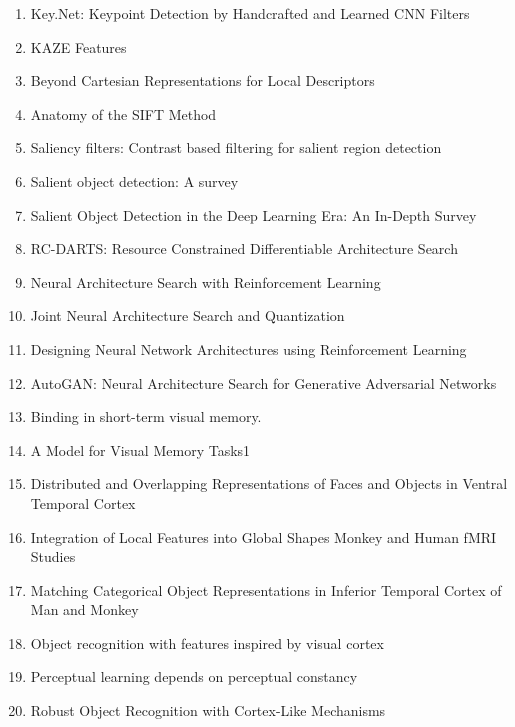 \documentclass[acmlarge]{acmart}
\begin{document}
\begin{enumerate}
	\item Key.Net: Keypoint Detection by Handcrafted and Learned CNN Filters \cite{Laguna2019KeyNetKD}
	\item KAZE Features \cite{Alcantarilla2012KAZEF}
	\item Beyond Cartesian Representations for Local Descriptors \cite{Ebel2019BeyondCR}
	\item Anatomy of the SIFT Method \cite{ReyOtero2014AnatomyOT}
	\item Saliency filters: Contrast based filtering for salient region detection \cite{Perazzi2012SaliencyFC}
	\item Salient object detection: A survey \cite{Borji2019SalientOD}
	\item Salient Object Detection in the Deep Learning Era: An In-Depth Survey \cite{Wang2019SalientOD}
	\item RC-DARTS: Resource Constrained Differentiable Architecture Search \cite{Jin2019RCDARTSRC}
	\item Neural Architecture Search with Reinforcement Learning \cite{Zoph2017NeuralAS}
	\item Joint Neural Architecture Search and Quantization \cite{Chen2018JointNA}
	\item Designing Neural Network Architectures using Reinforcement Learning \cite{Baker2017DesigningNN}
	\item AutoGAN: Neural Architecture Search for Generative Adversarial Networks \cite{Gong2019AutoGANNA}
	\item Binding in short-term visual memory. \cite{Wheeler2002BindingIS}
	\item A Model for Visual Memory Tasks1 \cite{Sperling1963AMF}
	\item Distributed and Overlapping Representations of Faces and Objects in Ventral Temporal Cortex \cite{Haxby2001DistributedAO}
	\item Integration of Local Features into Global Shapes Monkey and Human fMRI Studies \cite{Kourtzi2003IntegrationOL}
	\item Matching Categorical Object Representations in Inferior Temporal Cortex of Man and Monkey \cite{Kriegeskorte2008MatchingCO}
	\item Object recognition with features inspired by visual cortex \cite{Serre2005ObjectRW}
	\item Perceptual learning depends on perceptual constancy \cite{Garrigan2008PerceptualLD}
	\item Robust Object Recognition with Cortex-Like Mechanisms \cite{Serre2007RobustOR}

\end{enumerate}
\end{document}
